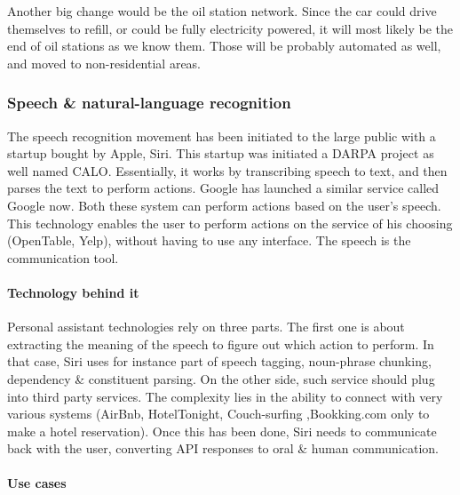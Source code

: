 \documentclass[12pt]{article}
\begin{document}
\smallskip

Another big change would be the oil station network. Since the car could drive
themselves to refill, or could be fully electricity powered, it will most likely
be the end of oil stations as we know them. Those will be probably automated as
well, and moved to non-residential areas.


\subsubsection{Speech \& natural-language recognition}

The speech recognition movement has been initiated to the large public with a
startup bought by Apple, Siri. This startup was initiated a DARPA project as
well named CALO. Essentially, it works by transcribing speech to text, and then
parses the text to perform actions. Google has launched a similar service called
Google now. Both these system can perform actions based on the user's speech.
This technology enables the user to perform actions on the service of his
choosing (OpenTable, Yelp), without having to use any interface. The speech is
the communication tool.
\\

\paragraph{Technology behind it}
Personal assistant technologies rely on three parts.
The first one is about extracting the meaning of the speech to figure out which
action to perform. In that case, Siri uses for instance part of speech tagging,
noun-phrase chunking, dependency \& constituent parsing. On the other side,
such service should plug into third party services. The complexity lies in the
ability to connect with very various systems (AirBnb, HotelTonight, Couch-surfing
,Bookking.com only to make a hotel reservation). Once this has been done, Siri
needs to communicate back with the user, converting API responses to oral \&
human communication.

\paragraph{Use cases}
\end{document}
